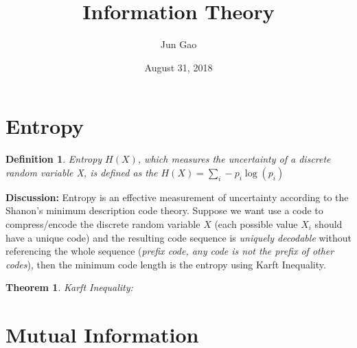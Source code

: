 \documentclass[12pt]{article}
\newtheorem{theorem}{Theorem}
\newtheorem{definition}{Definition}
\begin{document}
 
\title{Information Theory}
\author{Jun Gao}
\date{August 31, 2018}

\maketitle
\section{Entropy}
\begin{definition}
	Entropy $H(X)$, which measures the uncertainty of a discrete random variable X, is defined as the $H(X)=\sum_i - p_i \log(p_i)$
\end{definition}
\textbf{Discussion: } Entropy is an effective measurement of uncertainty according to the Shanon's minimum description code theory. Suppose we want use a code to compress/encode the discrete random variable $X$ (each possible value $X_i$ should have a unique code) and the resulting code sequence is \textit{uniquely decodable} without referencing the whole sequence (\textit{prefix code, any code is not the prefix of other codes}), then the minimum code length is the entropy using Karft Inequality. 
\begin{theorem}
	Karft Inequality: 
\end{theorem}

\section{Mutual Information}
\end{document}

